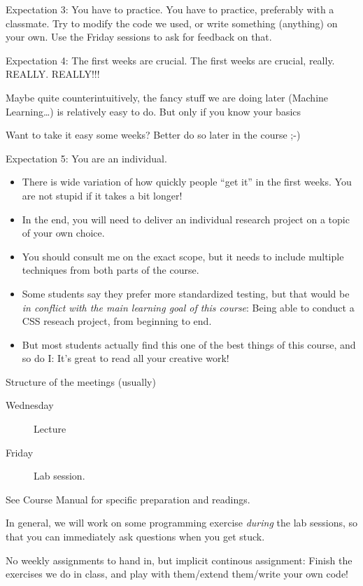 \begin{frame}{Expectation 3: You have to practice.}
	You have to practice, preferably with a classmate. Try to modify the code we used, or write something (anything) on your own. Use the Friday sessions to ask for feedback on that.
\end{frame}




\begin{frame}{Expectation 4: The first weeks are crucial.}
The first weeks are crucial, really. REALLY. REALLY!!!

Maybe quite counterintuitively, the fancy stuff we are doing later (Machine Learning\ldots) is relatively easy to do. But only if you know your basics %

Want to take it easy some weeks? Better do so later in the course ;-)
\end{frame}






\begin{frame}{Expectation 5: You are an individual.}
\begin{itemize}
	\item There is wide variation of how quickly people ``get it'' in the first weeks. You are not stupid if it takes a bit longer!
	\item In the end, you will need to deliver an individual research project on a topic of your own choice.
	\item You should consult me on the exact scope, but it needs to include multiple techniques from both parts of the course.
	\item Some students say they prefer more standardized testing, but that would be \emph{in conflict with the main learning goal of this course}: Being able to conduct a CSS reseach project, from beginning to end.
	\item But most students actually find this one of the best things of this course, and so do I: It's great to read all your creative work!
\end{itemize}

\end{frame}


\begin{frame}{Structure of the meetings (usually)}
	\begin{description}
		\item[Wednesday] Lecture
		\item[Friday]Lab session.
	\end{description}
See Course Manual for specific preparation and readings.

In general, we will work on some programming exercise \emph{during} the lab sessions, so that you can immediately ask questions when you get stuck.

No weekly assignments to hand in, but implicit continous assignment: Finish the exercises we do in class, and play with them/extend them/write your own code!
\end{frame}

